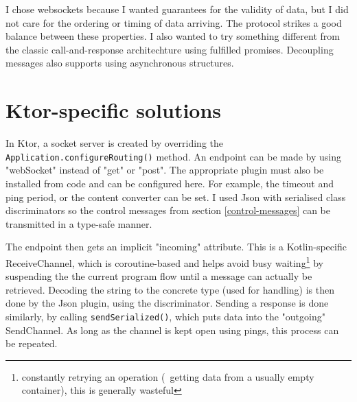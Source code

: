 I chose websockets because I wanted guarantees for the validity of data, but I did not care for the ordering or timing of data arriving. The protocol strikes a good balance between these properties. I also wanted to try something different from the classic call-and-response architechture using fulfilled promises. Decoupling messages also supports using asynchronous structures.

\section{Ktor-specific solutions}

In Ktor, a socket server is created by overriding the \verb|Application.configureRouting()| method. An endpoint can be made by using "webSocket" instead of "get" or "post". The appropriate plugin must also be installed from code and can be configured here. For example, the timeout and ping period, or the content converter can be set. I used Json with serialised class discriminators so the control messages from section \ref{control-messages} can be transmitted in a type-safe manner.

The endpoint then gets an implicit "incoming" attribute. This is a Kotlin-specific ReceiveChannel, which is coroutine-based and helps avoid busy waiting\footnote{constantly retrying an operation (\eg~getting data from a usually empty container), this is generally wasteful} by suspending the the current program flow until a message can actually be retrieved. Decoding the string to the concrete type (used for handling) is then done by the Json plugin, using the discriminator. Sending a response is done similarly, by calling \verb|sendSerialized()|, which puts data into the "outgoing" SendChannel. As long as the channel is kept open using pings, this process can be repeated.